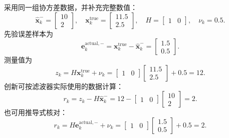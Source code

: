 \documentclass[UTF8,a4paper,11pt]{ctexart}
\newcommand{\prior}{^{-}}
\begin{document}
采用同一组协方差数据，并补充完整数值：
\begin{equation}
\hat{\bm x}_k\prior=
\begin{bmatrix}10\\2\end{bmatrix},\quad
\bm x_k^{\mathrm{true}}=
\begin{bmatrix}11.5\\2.5\end{bmatrix},\quad
H=\begin{bmatrix}1&0\end{bmatrix},\quad
\nu_k=0.5.
\end{equation}
先验误差样本为
\begin{equation}
\bm e_k^{\mathrm{actual},-}
=\bm x_k^{\mathrm{true}}-\hat{\bm x}_k\prior
=\begin{bmatrix}1.5\\0.5\end{bmatrix}.
\end{equation}
测量值为
\begin{equation}
z_k=H\bm x_k^{\mathrm{true}}+\nu_k
=\begin{bmatrix}1&0\end{bmatrix}
\begin{bmatrix}11.5\\2.5\end{bmatrix}+0.5
=12.
\end{equation}
创新可按滤波器实际使用的数据计算：
\begin{equation}
r_k=z_k-H\hat{\bm x}_k\prior
=12-\begin{bmatrix}1&0\end{bmatrix}
\begin{bmatrix}10\\2\end{bmatrix}=2.
\end{equation}
也可用推导式核对：
\begin{equation}
r_k=H\bm e_k^{\mathrm{actual},-}+\nu_k
=\begin{bmatrix}1&0\end{bmatrix}
\begin{bmatrix}1.5\\0.5\end{bmatrix}+0.5=2.
\end{equation}
\end{document}
